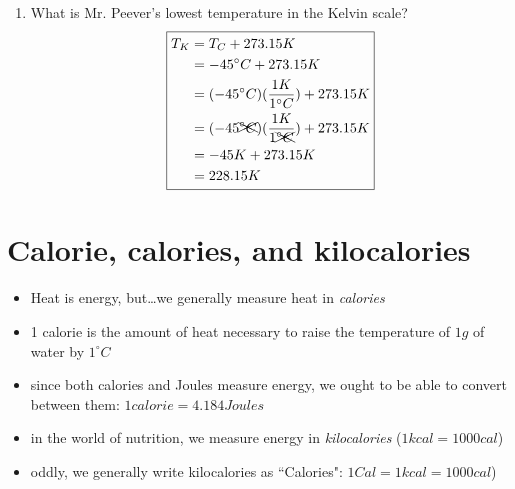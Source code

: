 \documentclass[11pt, oneside]{article}   	%
\begin{document}
\begin{enumerate}[label=Example \arabic*]
  \item What is Mr. Peever's lowest temperature in the Kelvin scale?
\begin{equation} 
\boxed{
\begin{split}
    T_K  &= T_C + 273.15 K \\
             &= -45 ^{\circ} C +  273.15 K \\
             &= (-45 ^{\circ} C)(\frac{1 K}{1 ^{\circ}C}) +  273.15 K \\
             &= (-45 \xcancel{^{\circ} C})(\frac{1 K}{1 \xcancel{^{\circ}C}}) +  273.15 K \\
             &= -45 K +  273.15 K \\
             &= 228.15 K \\
 \end{split}
 }
 \end{equation}
 
 \end{enumerate}

\section{Calorie, calories, and kilocalories}
\begin{itemize}
\item Heat is energy, but\ldots we generally measure heat in \emph{calories}
\item 1 calorie is the amount of heat necessary to raise the temperature of $1g$ of water by $1^{\circ} C$
\item since both calories and Joules measure energy, we ought to be able to convert between them: $1 calorie = 4.184 Joules$ \cite[p. 48]{wile-chem-2}
\item in the world of nutrition, we measure energy in \emph{kilocalories} ($1 kcal = 1000 cal$)
\item oddly, we generally write kilocalories as ``Calories": $1 Cal = 1 kcal = 1000 cal$)
\end{itemize}
\end{document}
